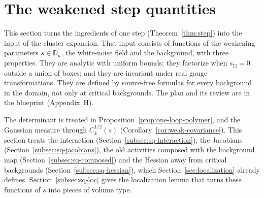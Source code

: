 \section{The weakened step quantities}\label{sec:step-quantities}

This section turns the ingredients of one step (Theorem~\ref{thm:step}) into the input of the cluster expansion. That input consists of functions of the weakening parameters $s\in\mathbb D_\kappa$, the white-noise field and the background, with three properties. They are analytic with uniform bounds; they factorize when $s_\Box=0$ outside a union of boxes; and they are invariant under real gauge transformations. They are defined by source-free formulas for every background in the domain, not only at critical backgrounds. The plan and its review are in the blueprint (Appendix~H).

The determinant is treated in Proposition~\ref{prop:one-loop-polymer}, and the Gaussian measure through $C_k^{1/2}(s)$ (Corollary~\ref{cor:weak-covariance}). This section treats the interaction (Section~\ref{subsec:sq-interaction}), the Jacobians (Section~\ref{subsec:sq-jacobians}), the old activities composed with the background map (Section~\ref{subsec:sq-composed}) and the Hessian away from critical backgrounds (Section~\ref{subsec:sq-hessian}), which Section~\ref{sec:localization} already defines. Section~\ref{subsec:sq-loc} gives the localization lemma that turns these functions of $s$ into pieces of volume type.

